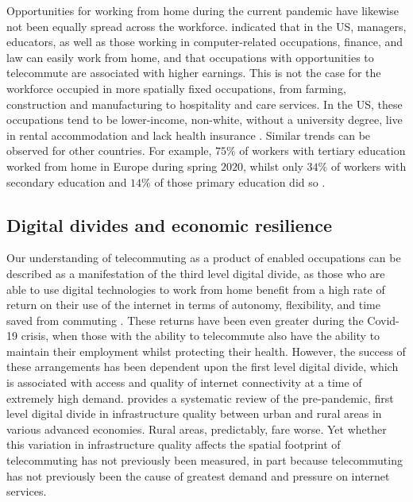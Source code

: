 \documentclass[Royal,times,sageh]{sagej}
\begin{document}
Opportunities for working from home during the current pandemic have
likewise not been equally spread across the workforce.
\citet{NBERw26948} indicated that in the US, managers, educators, as
well as those working in computer-related occupations, finance, and law
can easily work from home, and that occupations with opportunities to
telecommute are associated with higher earnings. This is not the case
for the workforce occupied in more spatially fixed occupations, from
farming, construction and manufacturing to hospitality and care
services. In the US, these occupations tend to be lower-income,
non-white, without a university degree, live in rental accommodation and
lack health insurance \citep{NBERw27085}. Similar trends can be observed
for other countries. For example, \(75\)\% of workers with tertiary
education worked from home in Europe during spring \(2020\), whilst only
\(34\)\% of workers with secondary education and \(14\)\% of those
primary education did so \citep{eurofound2020}.

\hypertarget{sec:2.2}{%
\subsection{Digital divides and economic resilience}\label{sec:2.2}}

Our understanding of telecommuting as a product of enabled occupations
can be described as a manifestation of the third level digital divide,
as those who are able to use digital technologies to work from home
benefit from a high rate of return on their use of the internet in terms
of autonomy, flexibility, and time saved from commuting
\citep{peters2004employees, siha2006telecommuting, singh2013modeling}.
These returns have been even greater during the Covid-19 crisis, when
those with the ability to telecommute also have the ability to maintain
their employment whilst protecting their health. However, the success of
these arrangements has been dependent upon the first level digital
divide, which is associated with access and quality of internet
connectivity at a time of extremely high demand. \citet{SALEMINK2017360}
provides a systematic review of the pre-pandemic, first level digital
divide in infrastructure quality between urban and rural areas in
various advanced economies. Rural areas, predictably, fare worse. Yet
whether this variation in infrastructure quality affects the spatial
footprint of telecommuting has not previously been measured, in part
because telecommuting has not previously been the cause of greatest
demand and pressure on internet services.
\end{document}
